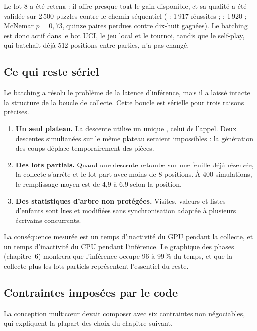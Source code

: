 Le lot 8 a \'et\'e retenu : il offre presque tout le gain disponible, et sa
qualit\'e a \'et\'e valid\'ee sur 2\,500 puzzles contre le chemin s\'equentiel
( : 1\,917 r\'eussites ;  : 1\,920 ; McNemar
$p = 0{,}73$, quinze paires perdues contre dix-huit gagn\'ees). Le batching
est donc actif dans le bot UCI, le jeu local et le tournoi, tandis que le
self-play, qui batchait d\'ej\`a 512 positions entre parties, n'a pas
chang\'e.

\subsection{Ce qui reste s\'eriel}

Le batching a r\'esolu le probl\`eme de la latence d'inf\'erence, mais il a
laiss\'e intacte la structure de la boucle de collecte. Cette boucle est
s\'erielle pour trois raisons pr\'ecises.

\begin{enumerate}[leftmargin=1.4em]
  \item \textbf{Un seul plateau.} La descente utilise un unique
  , celui de l'appel. Deux descentes simultan\'ees sur le
  m\^eme plateau seraient impossibles : la g\'en\'eration des coups d\'eplace
  temporairement des pi\`eces.
  \item \textbf{Des lots partiels.} Quand une descente retombe sur une
  feuille d\'ej\`a r\'eserv\'ee, la collecte s'arr\^ete et le lot part avec
  moins de 8 positions. \`A 400 simulations, le remplissage moyen est de
  4,9 \`a 6,9 selon la position.
  \item \textbf{Des statistiques d'arbre non prot\'eg\'ees.} Visites, valeurs
  et listes d'enfants sont lues et modifi\'ees sans synchronisation adapt\'ee
  \`a plusieurs \'ecrivains concurrents.
\end{enumerate}

La cons\'equence mesur\'ee est un temps d'inactivit\'e du GPU pendant la
collecte, et un temps d'inactivit\'e du CPU pendant l'inf\'erence. Le
graphique des phases (chapitre~6) montrera que l'inf\'erence occupe 96 \`a
99\,\% du temps, et que la collecte plus les lots partiels repr\'esentent
l'essentiel du reste.

\subsection{Contraintes impos\'ees par le code}

La conception multic\oe{}ur devait composer avec six contraintes non
n\'egociables, qui expliquent la plupart des choix du chapitre suivant.


